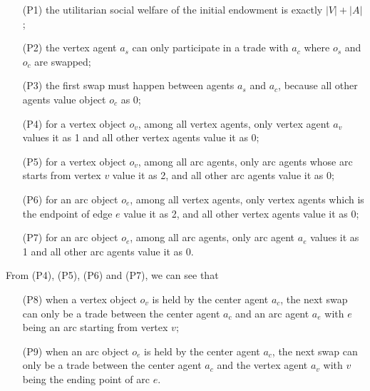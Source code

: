\begin{enumerate}
\item [(P1)] the utilitarian social welfare of the initial endowment is exactly $|V|+|A|$;
\item [(P2)] the vertex agent $a_s$ can only participate in a trade with $a_c$ where $o_s$ and $o_c$ are swapped;
\item [(P3)] the first swap must happen between agents $a_s$ and $a_c$, because all other agents value object $o_c$ as 0;
\item [(P4)] for a vertex object $o_v$, among all vertex agents, only vertex agent $a_v$ values it as 1 and all other vertex agents value it as 0;
\item [(P5)] for a vertex object $o_v$, among all arc agents, only arc agents whose arc starts from vertex $v$ value it as 2, and all other arc agents value it as 0;
\item [(P6)] for an arc object $o_e$, among all vertex agents, only vertex agents which is the endpoint of edge $e$ value it as 2, and all other vertex agents value it as 0;
\item [(P7)] for an arc object $o_e$, among all arc agents, only arc agent $a_e$ values it as 1 and all other arc agents value it as 0.
\end{enumerate}

From (P4), (P5), (P6) and (P7), we can see that
\begin{enumerate}
\item [(P8)] when a vertex object $o_v$ is held by the center agent $a_c$, the next swap can only be a trade
between the center agent $a_c$ and an arc agent $a_e$ with $e$ being an arc starting from vertex $v$;
\item [(P9)] when an arc object $o_e$ is held by the center agent $a_c$, the next swap can only be a trade
between the center agent $a_c$ and the vertex agent $a_v$ with $v$ being the ending point of arc $e$.
\end{enumerate}

